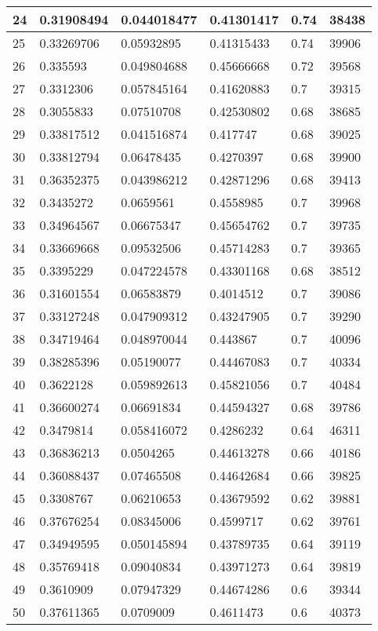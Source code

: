 \begin{longtable}{|l|l|l|l|l|l|}
24 & 0.31908494 & 0.044018477 & 0.41301417 & 0.74 & 38438 \\ \hline 
25 & 0.33269706 & 0.05932895 & 0.41315433 & 0.74 & 39906 \\ \hline 
26 & 0.335593 & 0.049804688 & 0.45666668 & 0.72 & 39568 \\ \hline 
27 & 0.3312306 & 0.057845164 & 0.41620883 & 0.7 & 39315 \\ \hline 
28 & 0.3055833 & 0.07510708 & 0.42530802 & 0.68 & 38685 \\ \hline 
29 & 0.33817512 & 0.041516874 & 0.417747 & 0.68 & 39025 \\ \hline 
30 & 0.33812794 & 0.06478435 & 0.4270397 & 0.68 & 39900 \\ \hline 
31 & 0.36352375 & 0.043986212 & 0.42871296 & 0.68 & 39413 \\ \hline 
32 & 0.3435272 & 0.0659561 & 0.4558985 & 0.7 & 39968 \\ \hline 
33 & 0.34964567 & 0.06675347 & 0.45654762 & 0.7 & 39735 \\ \hline 
34 & 0.33669668 & 0.09532506 & 0.45714283 & 0.7 & 39365 \\ \hline 
35 & 0.3395229 & 0.047224578 & 0.43301168 & 0.68 & 38512 \\ \hline 
36 & 0.31601554 & 0.06583879 & 0.4014512 & 0.7 & 39086 \\ \hline 
37 & 0.33127248 & 0.047909312 & 0.43247905 & 0.7 & 39290 \\ \hline 
38 & 0.34719464 & 0.048970044 & 0.443867 & 0.7 & 40096 \\ \hline 
39 & 0.38285396 & 0.05190077 & 0.44467083 & 0.7 & 40334 \\ \hline 
40 & 0.3622128 & 0.059892613 & 0.45821056 & 0.7 & 40484 \\ \hline 
41 & 0.36600274 & 0.06691834 & 0.44594327 & 0.68 & 39786 \\ \hline 
42 & 0.3479814 & 0.058416072 & 0.4286232 & 0.64 & 46311 \\ \hline 
43 & 0.36836213 & 0.0504265 & 0.44613278 & 0.66 & 40186 \\ \hline 
44 & 0.36088437 & 0.07465508 & 0.44642684 & 0.66 & 39825 \\ \hline 
45 & 0.3308767 & 0.06210653 & 0.43679592 & 0.62 & 39881 \\ \hline 
46 & 0.37676254 & 0.08345006 & 0.4599717 & 0.62 & 39761 \\ \hline 
47 & 0.34949595 & 0.050145894 & 0.43789735 & 0.64 & 39119 \\ \hline 
48 & 0.35769418 & 0.09040834 & 0.43971273 & 0.64 & 39819 \\ \hline 
49 & 0.3610909 & 0.07947329 & 0.44674286 & 0.6 & 39344 \\ \hline 
50 & 0.37611365 & 0.0709009 & 0.4611473 & 0.6 & 40373 \\ \hline 
\end{longtable}
